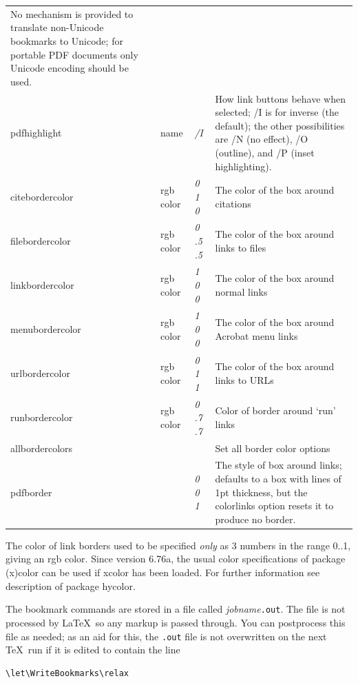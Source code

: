 \documentclass{article}
\newcommand*{\xpackage}[1]{\textsf{#1}}
\begin{document}
\begin{longtable}{@{}>{\ttfamily}ll>{\itshape}lp{7.6cm}@{}}
    No mechanism is provided to translate non-Unicode bookmarks to
    Unicode; for portable PDF documents only Unicode encoding should
    be used.\\
pdfhighlight       & name      & /I      & How link buttons behave when selected; /I is for inverse (the default);
                                           the other possibilities are /N (no effect), /O (outline), and /P (inset
                                           highlighting). \\
citebordercolor    & rgb color & 0 1 0   & The color of the box around citations \\
filebordercolor    & rgb color & 0 .5 .5 & The color of the box around links to files \\
linkbordercolor    & rgb color & 1 0 0   & The color of the box around normal links \\
menubordercolor    & rgb color & 1 0 0   & The color of the box around Acrobat menu links \\
urlbordercolor     & rgb color & 0 1 1   & The color of the box around links to URLs \\
runbordercolor     & rgb color & 0 .7 .7 & Color of border around `run' links \\
allbordercolors    &           &         & Set all border color options \\
pdfborder          &           & 0 0 1   & The style of box around links; defaults to a box with lines of 1pt thickness,
                                           but the colorlinks option resets it to produce no border.
\end{longtable}

The color of link borders used to be specified \emph{only} as 3
numbers in the range 0..1, giving an rgb color. Since version 6.76a, the usual
color specifications of package \xpackage{(x)color} can be used if \xpackage{xcolor}
has been loaded.
For further information see description of package \xpackage{hycolor}.

The bookmark commands are stored in a file called
\textit{jobname}\texttt{.out}. The file is not processed by \LaTeX\ so
any markup is passed through. You can postprocess this file as needed;
as an aid for this, the \texttt{.out} file is not overwritten on the
next \TeX\ run if it is edited to contain the line
\begin{verbatim}
\let\WriteBookmarks\relax
\end{verbatim}
\end{document}
